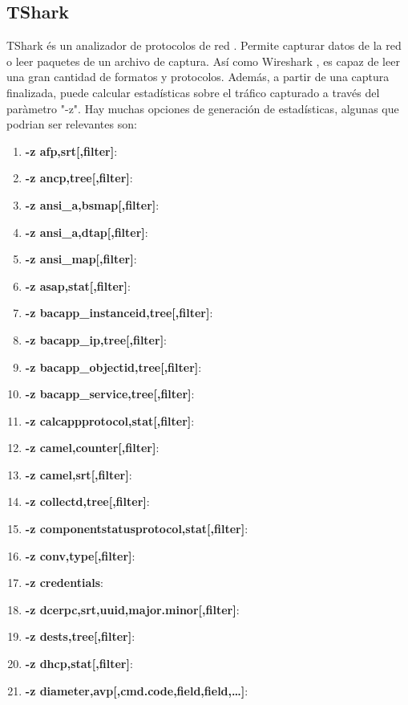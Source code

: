 \subsection{TShark}

TShark és un analizador de protocolos de red \cite{tsharkmanual}. Permite capturar datos de la red o leer paquetes de un archivo de captura. Así como Wireshark \cite{wsharkmanual}, es capaz de leer una gran cantidad de formatos y protocolos. Además, a partir de una captura finalizada, puede calcular estadísticas sobre el tráfico capturado a través del paràmetro "-z". Hay muchas opciones de generación de estadísticas, algunas que podrian ser relevantes son:

\begin{enumerate}
    \item \textbf{-z afp,srt[,filter]}: 
    \item \textbf{-z ancp,tree[,filter]}: 
    \item \textbf{-z ansi\_a,bsmap[,filter]}: 
    \item \textbf{-z ansi\_a,dtap[,filter]}: 
    \item \textbf{-z ansi\_map[,filter]}: 
    \item \textbf{-z asap,stat[,filter]}: 
    \item \textbf{-z bacapp\_instanceid,tree[,filter]}: 
    \item \textbf{-z bacapp\_ip,tree[,filter]}: 
    \item \textbf{-z bacapp\_objectid,tree[,filter]}: 
    \item \textbf{-z bacapp\_service,tree[,filter]}: 
    \item \textbf{-z calcappprotocol,stat[,filter]}: 
    \item \textbf{-z camel,counter[,filter]}: 
    \item \textbf{-z camel,srt[,filter]}: 
    \item \textbf{-z collectd,tree[,filter]}: 
    \item \textbf{-z componentstatusprotocol,stat[,filter]}: 
    \item \textbf{-z conv,type[,filter]}: 
    \item \textbf{-z credentials}: 
    \item \textbf{-z dcerpc,srt,uuid,major.minor[,filter]}: 
    \item \textbf{-z dests,tree[,filter]}: 
    \item \textbf{-z dhcp,stat[,filter]}: 
    \item \textbf{-z diameter,avp[,cmd.code,field,field,…​]}: 

\end{enumerate}
